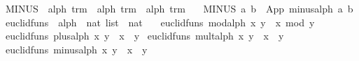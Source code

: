 \begin{isabellebody}
\isanewline
{}\isamarkupfalse%
\ MINUS\ {}{}\ {}alph\ trm\ {}\ alph\ trm\ {}\ alph\ trm{}\ \isanewline
\ \ {}MINUS\ a\ b\ {}\ {}App\ minus{}alph\ {}a{}\ b{}{}{}\isanewline
\isanewline
{}\isamarkupfalse%
\ euclid{}funs\ {}{}\ {}alph\ {}\ nat\ list\ {}\ nat{}\ \isanewline
\ \ {}euclid{}funs\ mod{}alph\ {}x{}\ y{}\ {}\ x\ mod\ y{}\isanewline
{}\ {}euclid{}funs\ plus{}alph\ {}x{}\ y{}\ {}\ x\ {}\ y{}\isanewline
{}\ {}euclid{}funs\ mult{}alph\ {}x{}\ y{}\ {}\ x\ {}\ y{}\isanewline
{}\ {}euclid{}funs\ minus{}alph\ {}x{}\ y{}\ {}\ x\ {}\ y{}\isanewline

\end{isabellebody}
